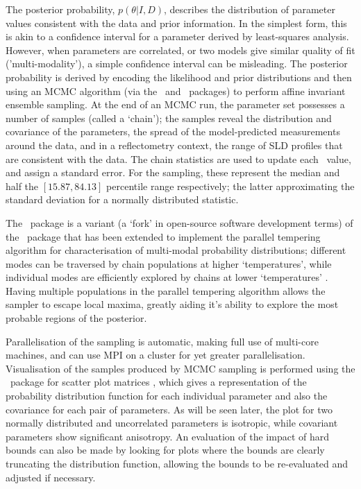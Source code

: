 \documentclass[pdf,preprint]{iucr}
\begin{document}
The posterior probability, $p(\theta | I, D)$, describes the distribution of parameter values consistent with the data and prior information. In the simplest form, this is akin to a confidence interval for a parameter derived by least-squares analysis. However, when parameters are correlated, or two models give similar quality of fit ('multi-modality'), a simple confidence interval can be misleading.
 The posterior probability is derived by encoding the likelihood and prior distributions and then using an MCMC algorithm (via the \emcee\ and \ptemcee\ packages) to perform affine invariant ensemble sampling.\cite{emcee, ptemcee}
At the end of an MCMC run, the parameter set possesses a number of samples (called a `chain'); the samples reveal the distribution and covariance of the parameters, the spread of the model-predicted measurements around the data, and in a reflectometry context, the range of SLD profiles that are consistent with the data.
The chain statistics are used to update each \Parameter\ value, and assign a standard error. For the sampling, these represent the median and half the $[15.87, 84.13]$ percentile range respectively; the latter approximating the standard deviation for a normally distributed statistic.

The \ptemcee\ package is a variant (a `fork' in open-source software development terms) of the \emcee\ package that has been extended to implement the parallel tempering algorithm for characterisation of multi-modal probability distributions; different modes can be traversed by chain populations at higher `temperatures', while individual modes are efficiently explored by chains at lower `temperatures' \cite{ptemcee}.  Having multiple populations in the parallel tempering algorithm allows the sampler to escape local maxima, greatly aiding it's ability to explore the most probable regions of the posterior.

Parallelisation of the sampling is automatic, making full use of multi-core machines, and can use MPI on a cluster for yet greater parallelisation. Visualisation of the samples produced by MCMC sampling is performed using the \corner\ package for scatter plot matrices \cite{corner}, which gives a representation of the probability distribution function for each individual parameter and also the covariance for each pair of parameters. As will be seen later, the plot for two normally distributed and uncorrelated parameters is isotropic, while covariant parameters show significant anisotropy. An evaluation of the impact of hard bounds can also be made by looking for plots where the bounds are clearly truncating the distribution function, allowing the bounds to be re-evaluated and adjusted if necessary.
\end{document}
